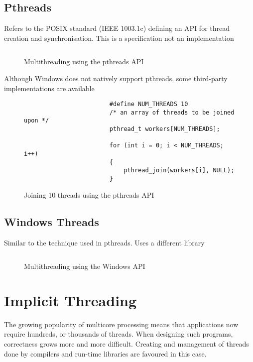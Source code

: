 \documentclass{book}
\begin{document}
            \subsection{Pthreads}
                Refers to the POSIX standard (IEEE 1003.1c) defining an API for thread creation and synchronisation.
                This is a specification not an implementation
                \begin{figure}[H]
                    \centering
                    \inputminted{c}{code/threads/pthreads.c}
                    \caption{Multithreading using the pthreads API}
                \end{figure}
                Although Windows does not natively support pthreads, some third-party implementations are available
                \begin{figure}[H]
                    \centering
                    \begin{verbatim}
                        #define NUM_THREADS 10
                        /* an array of threads to be joined upon */
                        pthread_t workers[NUM_THREADS];

                        for (int i = 0; i < NUM_THREADS; i++)
                        {
                            pthread_join(workers[i], NULL);
                        }
                    \end{verbatim}
                    \caption{Joining 10 threads using the pthreads API}
                \end{figure}
            \subsection{Windows Threads}
                Similar to the technique used in pthreads. Uses a different library
                \begin{figure}[H]
                    \centering
                    \inputminted{c}{code/threads/windows_threads.c}
                    \caption{Multithreading using the Windows API}
                \end{figure}
        \section{Implicit Threading}
            The growing popularity of multicore processing means that applications now require hundreds,
            or thousands of threads. When designing such programs, correctness grows more and more difficult.
            Creating and management of threads done by compilers and run-time libraries are favoured in this case.
\end{document}
